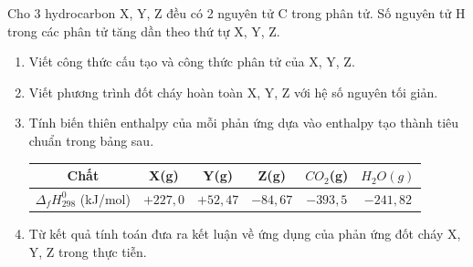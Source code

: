 \documentclass[Main.tex]{subfiles}
\begin{document}
	\begin{bt}
		Cho 3 hydrocarbon X, Y, Z đều có 2 nguyên tử C trong phân tử. Số nguyên tử H trong các phân tử tăng dần theo thứ tự X, Y, Z.
		\begin{enumerate}
			\item Viết công thức cấu tạo và công thức phân tử của X, Y, Z.
			\item Viết phương trình đốt cháy hoàn toàn X, Y, Z với hệ số nguyên tối giản.
			\item Tính biến thiên enthalpy của mỗi phản ứng dựa vào enthalpy tạo thành tiêu chuẩn trong bảng sau.
			\begin{center}
				\begin{tabular}{|c|c|c|c|c|c|}
					\hline
					Chất & X(g) & Y(g) & Z(g) & $CO_2$(g) & $H_2O(g)$ \\
					\hline
					$\Delta_fH_{298}^0$ (kJ/mol) & $+227{,}0$ & $+52{,}47$ & $-84{,}67$ & $-393{,}5$ & $-241{,}82$ \\
					\hline
				\end{tabular}
			\end{center}
			\item Từ kết quả tính toán đưa ra kết luận về ứng dụng của phản ứng đốt cháy X, Y, Z trong thực tiễn.
		\end{enumerate}
\end{bt}
\end{document}
